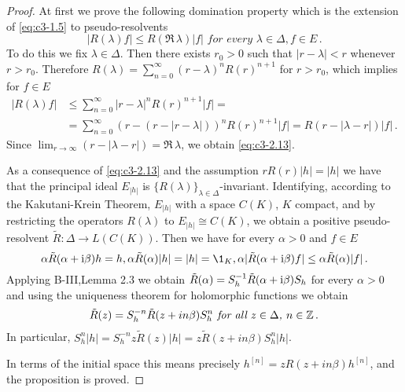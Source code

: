 \begin{proof}
At first we prove the following domination property which is the extension of \eqref{eq:c3-1.5} to pseudo-resolvents
\begin{equation}\label{eq:c3-2.13}
	|R(\lambda)f| \leq R(\Re\, \lambda) |f| \textit{ for every } \lambda \in \Delta , f \in E\,.
\end{equation}
To do this we fix $\lambda \in \Delta$.
Then there exists $r_{0} > 0$ such that $|r-\lambda| < r$ whenever $r > r_{0}$.
Therefore $R(\lambda) = \sum_{n=0}^{\infty}(r-\lambda)^{n}R(r)^{n+1}$ for $r > r_{0}$, which implies for $f \in E$
\begin{align*}
	|R(\lambda)f| &\leq \sum_{n=0}^{\infty}|r-\lambda|^{n}R(r)^{n+1}|f| = \\
	& =\sum_{n=0}^{\infty}(r - (r-|r-\lambda|))^{n}R(r)^{n+1}|f| = R(r - |\lambda-r|) |f|\,.
\end{align*}
Since $\lim_{r \to \infty} (r - |\lambda-r|) = \Re\, \lambda$, we obtain \eqref{eq:c3-2.13}.

As a consequence of \eqref{eq:c3-2.13} and the assumption $rR(r) |h| = |h|$ we have that the principal ideal $E_{|h|}$ is $\{R(\lambda)\}_{\lambda \in \Delta}$-invariant.
Identifying, according to the Kakutani-Krein Theorem, $E_{|h|}$ with a space $C(K)$, $K$ compact, and by restricting the operators $R(\lambda)$ to $E_{|h|} \cong C(K)$, we obtain a positive pseudo-resolvent $\tilde{R} : \Delta \to L(C(K))$.
Then we have for every $\alpha > 0$ and $f \in E$
\[
\alpha\tilde{R}(\alpha+\im\beta)h = h, \alpha\tilde{R}(\alpha) |h| = |h| = \1_{K}, \alpha|\tilde{R}(\alpha+\im\beta)f| \leq \alpha\tilde{R}(\alpha) |f|\,.
\]
Applying B-III,Lemma 2.3 we obtain $\tilde{R}(\alpha) = S_{h}^{-1}\tilde{R}(\alpha + \mathrm{i}\beta)S_{h}$ for every $\alpha > 0$ and using the uniqueness theorem for holomorphic functions we obtain
\begin{equation}\label{eq:c3-2.14}
\textit{$\tilde{R}(z) = S_{h}^{-n}\tilde{R}(z + in\beta)S_{h}^{n}$ for all $z \in \Delta$, $n \in \mathbb{Z}$}\,.
\end{equation}
In particular, $S_{h}^{n}|h| = S_{h}^{-n}z\tilde{R}(z) |h| = z\tilde{R}(z+in\beta)S_{h}^{n}|h|$.

In terms of the initial space this means precisely $h^{[n]} = zR(z+in\beta)h^{[n]}$, and the proposition is proved.
\end{proof}

